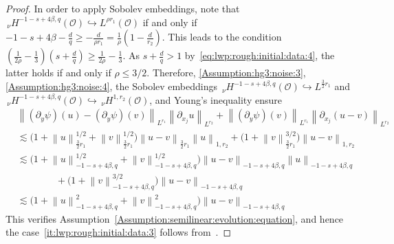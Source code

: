 \documentclass[reqno]{amsart}
\newcommand{\sO}{\mathscr{O}}
\newcommand{\1}{\mathbf{1}}
\newcommand{\nH}{\ensuremath{\,_\nu H}}
\newcommand{\bpsn}[1]{\ensuremath{\nH^{#1}(\sO)}}
\newcommand{\nrm}[1]{\left\lVert #1 \right\rVert}
\begin{document}
\begin{proof}
         In order to apply Sobolev embeddings, note that $\bpsn{-1-s+4\beta,q}\hookrightarrow L^{\rho r_1}(\sO)$ if and only if $-1-s+4\beta-\frac{d}{q}\ge -\frac{d}{\rho r_1}=\frac{1}{\rho}(1-\frac{d}{r_2})$. This leads to the condition $(\frac{1}{2\rho}-\frac{1}{3})(s+\frac{d}{q})\ge \frac{1}{2\rho}-\frac{1}{3}$. As $s+\frac{d}{q}>1$ by~\eqref{eq:lwp:rough:initial:data:4}, the latter holds if and  only if  $\rho\le 3/2$. Therefore, \eqref{Assumption:hg3:noise:3}, \eqref{Assumption:hg3:noise:4}, the Sobolev embeddings $\bpsn{-1-s+4\beta,q}\hookrightarrow L^{\frac{3}{2}r_1}$ and $\bpsn{-1-s+4\beta,q}\hookrightarrow \bpsn{1,r_2}$, and Young's inequality ensure
         \[\begin{aligned}
             &\nrm{(\partial_y\psi)(u)-(\partial_y \psi)(v)}_{L^{r_1}} \nrm{\partial_{x_j}u}_{L^{r_2}} + \nrm{(\partial_y\psi)(v)}_{L^{r_1}}\nrm{\partial_{x_j}(u-v)}_{L^{r_2}}\\
             &\lesssim \big(1+\nrm{u}_{\frac{3}{2}r_1}^{1/2} +\nrm{v}_{\frac{3}{2}r_1}^{1/2}\big) \nrm{u-v}_{\frac{3}{2}r_1} \nrm{u}_{1,r_2} +\big(1+ \nrm{v}_{\frac{3}{2}r_1}^{3/2}\big)\nrm{u-v}_{1,r_2}\\
             &\lesssim \big(1+\nrm{u}^{1/2}_{-1-s+4\beta,q}+\nrm{v}_{-1-s+4\beta,q}^{1/2}\big)\nrm{u-v}_{-1-s+4\beta,q} \nrm{u}_{-1-s+4\beta,q}\\
             &\qquad\qquad+ \big(1+\nrm{v}_{-1-s+4\beta,q}^{3/2}\big)\nrm{u-v}_{-1-s+4\beta,q}\\
             &\lesssim \big( 1+\nrm{u}_{-1-s+4\beta,q}^2+\nrm{v}_{-1-s+4\beta,q}^2\big)\nrm{u-v}_{-1-s+4\beta,q}
         \end{aligned}\]
         This verifies Assumption~\ref{Assumption:semilinear:evolution:equation}, and hence the case~\ref{it:lwp:rough:initial:data:3} follows from~\cite[Theorem 4.3]{agrestiNonlinearParabolicStochastic2022a}.

        \medskip
        

\end{proof}
\end{document}

